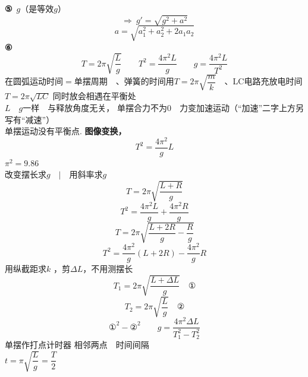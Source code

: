 \textbf{⑤}\ $g$（是等效$g$）
\[
\Rightarrow\ g'=\sqrt{g^2+a^2}
\]
\[
a=\sqrt{a_1^2+a_2^2+2a_1a_2}
\] %
\textbf{⑥}
\[
T=2\pi\sqrt{\dfrac{L}{g}}\qquad T^2=\dfrac{4\pi^2L}{g}\qquad \boxed{g=\dfrac{4\pi^2L}{T^2}}
\]
在圆弧运动时间$=$单摆周期　、弹簧的时间用$T=2\pi\sqrt{\dfrac{m}{k}}$　、LC电路充放电时间$T=2\pi\sqrt{LC}$
同时放会相遇在平衡处\\
$L$　$g$一样　与释放角度无关，
单摆合力不为$0$　力变加速运动（“加速”二字上方另写有“减速”）\\
单摆运动没有平衡点.
\textbf{图像变换，}
\[
T^2=\dfrac{4\pi^2}{g}L
\]
$\pi^2=9.86$\\
改变摆长求$g$　$\big|$　用斜率求$g$
\[
T=2\pi\sqrt{\dfrac{L+R}{g}}
\]
\[
T^2=\dfrac{4\pi^2L}{g}+\dfrac{4\pi^2R}{g}
\]
\[
T=2\pi\sqrt{\dfrac{L+2R}{g}-\dfrac{R}{g}}
\]
\[
T^2=\dfrac{4\pi^2}{g}(L+2R)-\dfrac{4\pi^2}{g}R
\]
用纵截距求$k$ %
，剪$\Delta L$，不用测摆长
\[
T_1=2\pi\sqrt{\dfrac{L+\Delta L}{g}}\quad\text{①}
\]
\[
T_2=2\pi\sqrt{\dfrac{L}{g}}\quad\text{②}
\]
\[
\text{①}^2-\text{②}^2\qquad g=\dfrac{4\pi^2\Delta L}{T_1^2-T_2^2}
\]
单摆作打点计时器
相邻两点　时间间隔\\
$t=\pi\sqrt{\dfrac{L}{g}}=\dfrac{T}{2}$
